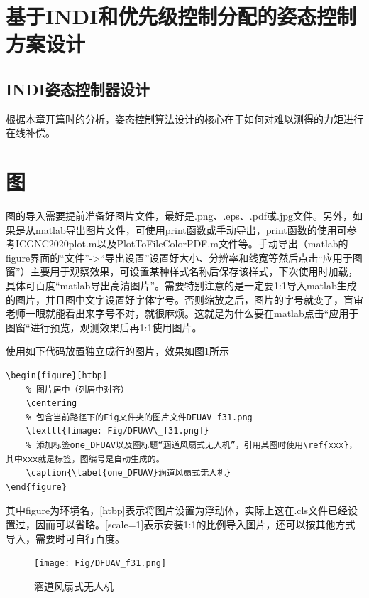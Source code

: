 \section{基于INDI和优先级控制分配的姿态控制方案设计}

\subsection{INDI姿态控制器设计}

根据本章开篇时的分析，姿态控制算法设计的核心在于如何对难以测得的力矩进行在线补偿。






















\section{图}
图的导入需要提前准备好图片文件，最好是.png、.eps、.pdf或.jpg文件。另外，如果是从matlab导出图片文件，可使用print函数或手动导出，print函数的使用可参考ICGNC2020plot.m以及PlotToFileColorPDF.m文件等。手动导出（matlab的figure界面的“文件”->“导出设置”设置好大小、分辨率和线宽等然后点击“应用于图窗”）主要用于观察效果，可设置某种样式名称后保存该样式，下次使用时加载，具体可百度“matlab导出高清图片”。需要特别注意的是一定要1:1导入matlab生成的图片，并且图中文字设置好字体字号。否则缩放之后，图片的字号就变了，盲审老师一眼就能看出来字号不对，就很麻烦。这就是为什么要在matlab点击“应用于图窗“进行预览，观测效果后再1:1使用图片。

使用如下代码放置独立成行的图片，效果如图\ref{one_DFUAV}所示
\begin{lstlisting}
\begin{figure}[htbp]
	% 图片居中（列居中对齐）
	\centering	
	% 包含当前路径下的Fig文件夹的图片文件DFUAV_f31.png
	\texttt{[image: Fig/DFUAV\_f31.png]} 
	% 添加标签one_DFUAV以及图标题“涵道风扇式无人机”，引用某图时使用\ref{xxx}，其中xxx就是标签，图编号是自动生成的。
	\caption{\label{one_DFUAV}涵道风扇式无人机} 
\end{figure}
\end{lstlisting}
其中figure为环境名，[htbp]表示将图片设置为浮动体，实际上这在.cls文件已经设置过，因而可以省略。[scale=1]表示安装1:1的比例导入图片，还可以按其他方式导入，需要时可自行百度。
\begin{figure}[htbp]
	\centering
	\texttt{[image: Fig/DFUAV\_f31.png]}
	\caption{\label{one_DFUAV}涵道风扇式无人机}
\end{figure}

